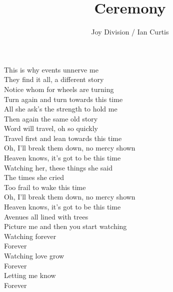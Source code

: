 \documentclass[12pt]{article}
\title{Ceremony}
\author{Joy Division / Ian Curtis}
\date{}
\begin{document}
\maketitle

\begin{center}
\begin{minipage}{0.8\textwidth}
This is why events unnerve me\\
They find it all, a different story\\
Notice whom for wheels are turning\\
Turn again and turn towards this time\\
All she ask's the strength to hold me\\
Then again the same old story\\
Word will travel, oh so quickly\\
Travel first and lean towards this time\\

Oh, I'll break them down, no mercy shown\\
Heaven knows, it's got to be this time\\
Watching her, these things she said\\
The times she cried\\
Too frail to wake this time\\

Oh, I'll break them down, no mercy shown\\
Heaven knows, it's got to be this time\\
Avenues all lined with trees\\
Picture me and then you start watching\\
Watching forever\\

Forever\\
Watching love grow\\
Forever\\
Letting me know\\
Forever
\end{minipage}
\end{center}
\end{document}
